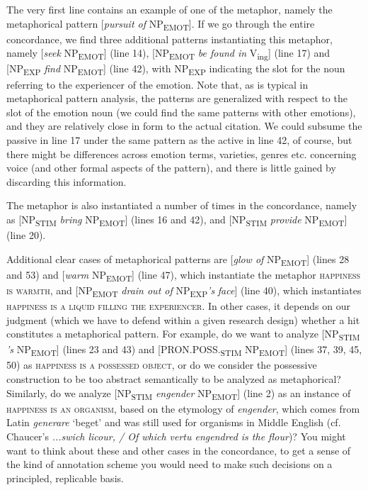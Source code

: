 The very first line contains an example of one of the  metaphor, namely the metaphorical pattern [\textit{pursuit of} NP\textsubscript{EMOT}]. If we go through the entire concordance, we find three additional patterns instantiating this metaphor, namely [\textit{seek} NP\textsubscript{EMOT}] (line 14), [NP\textsubscript{EMOT} \textit{be found in} V\textsubscript{ing}] (line 17) and [NP\textsubscript{EXP} \textit{find} NP\textsubscript{EMOT}] (line 42), with NP\textsubscript{EXP} indicating the slot for the noun referring to the experiencer of the emotion. Note that, as is typical in metaphorical pattern analysis, the patterns are generalized with respect to the slot of the emotion noun (we could find the same patterns with other emotions), and they are relatively close in form to the actual citation. We could subsume the passive in line 17 under the same pattern as the active in line 42, of course, but there might be differences across emotion terms, varieties, genres etc. concerning voice (and other formal aspects of the pattern), and there is little gained by discarding this information.  

The  metaphor is also instantiated a number of times in the concordance, namely as [NP\textsubscript{STIM} \textit{bring} NP\textsubscript{EMOT}] (lines 16 and 42), and [NP\textsubscript{STIM} \textit{provide} NP\textsubscript{EMOT}] (line 20).

Additional clear cases of metaphorical patterns are [\textit{glow of} NP\textsubscript{EMOT}] (lines 28 and 53) and [\textit{warm} NP\textsubscript{EMOT}] (line 47), which instantiate the metaphor \textsc{happiness is warmth}, and [NP\textsubscript{EMOT} \textit{drain out of} NP\textsubscript{EXP}\textit{'s} \textit{face}] (line 40), which instantiates \textsc{happiness is a liquid filling the experiencer}. In other cases, it depends on our judgment (which we have to defend within a given research design) whether a hit constitutes a metaphorical pattern. For example, do we want to analyze [NP\textsubscript{STIM} \textit{'s} NP\textsubscript{EMOT}] (lines 23 and 43) and [PRON.POSS.\textsubscript{STIM} NP\textsubscript{EMOT}] (lines 37, 39, 45, 50) as \textsc{happiness is a possessed object}, or do we consider the possessive construction to be too abstract semantically to be analyzed as metaphorical? Similarly, do we analyze [NP\textsubscript{STIM} \textit{engender} NP\textsubscript{EMOT}] (line 2) as an instance of \textsc{happiness is an organism}, based on the etymology of \textit{engender}, which comes from Latin \textit{generare} `beget' and was still used for organisms in Middle English (cf. Chaucer's \textit{...swich licour, / Of which vertu engendred is the flour})? You might want to think about these and other cases in the concordance, to get a sense of the kind of annotation scheme you would need to make such decisions on a principled, replicable basis.

